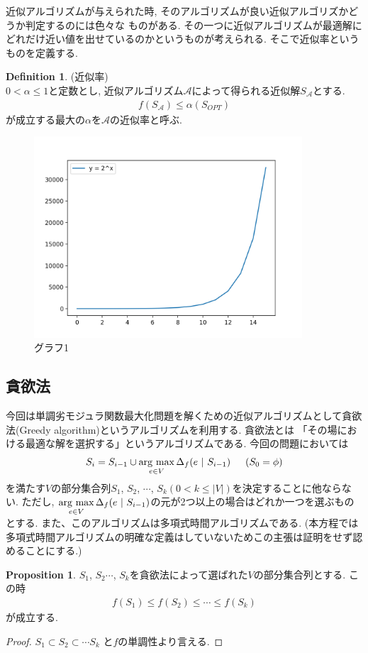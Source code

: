 \documentclass[11pt, a4paper, dvipdfmx]{jsarticle}
\theoremstyle{definition}
\newtheorem{Definition+}[Axiom+]{Definition}
\newtheorem{Proposition+}[Axiom+]{Proposition}
\begin{document}
近似アルゴリズムが与えられた時, そのアルゴリズムが良い近似アルゴリズかどうか判定するのには色々な
ものがある. その一つに近似アルゴリズムが最適解にどれだけ近い値を出せているのかというものが考えられる. そこで近似率というものを定義する.
\begin{Definition+}(近似率)\\
    $ 0< \alpha \leq 1$と定数とし, 近似アルゴリズム$\mathcal{A}$によって得られる近似解$S_{\mathcal{A}}$とする. 
    \begin{align*}
        f(S_{\mathcal{A}})\leq \alpha(S_{OPT})
    \end{align*}
    が成立する最大の$\alpha$を$\mathcal{A}$の近似率と呼ぶ.
\end{Definition+}
\begin{figure}[h]
    \centering
    \includegraphics[width = 100mm]{Graph1_houtei.png}
    \caption{グラフ1}
\end{figure}
\subsection{貪欲法}
 今回は単調劣モジュラ関数最大化問題を解くための近似アルゴリズムとして貪欲法(Greedy algorithm)というアルゴリズムを利用する. 貪欲法とは
「その場における最適な解を選択する」というアルゴリズムである. 今回の問題においては
\begin{align*}
    S_{i} = S_{i - 1}\cup\mathop{\rm arg~max}\limits_{e\in V}\Delta_{f}(e~|~S_{i - 1})\hspace{15pt}(S_{0} = \phi)
\end{align*}
を満たす$V$の部分集合列$S_{1}$, $S_{2}$, $\cdots$, $S_{k}(0<k\leq |V|)$を決定することに他ならない. ただし, $\mathop{\rm arg~max}\limits_{e\in V}\Delta_{f}(e~|~S_{i - 1})$の元が2つ以上の場合はどれか一つを選ぶものとする. 
また、このアルゴリズムは多項式時間アルゴリズムである. (本方程では多項式時間アルゴリズムの明確な定義はしていないためこの主張は証明をせず認めることにする.) 
\begin{Proposition+}
$S_{1}$, $S_{2}$$\cdots$, $S_{k}$を貪欲法によって選ばれた$V$の部分集合列とする. この時
    \begin{align*}
        f(S_{1})\leq f(S_{2})\leq \cdots \leq f(S_{k})
    \end{align*}
    が成立する.
    \begin{proof}
        $S_{1}\subset S_{2}\subset \cdots S_{k}$ と$f$の単調性より言える.
    \end{proof}
\end{Proposition+}
\end{document}
